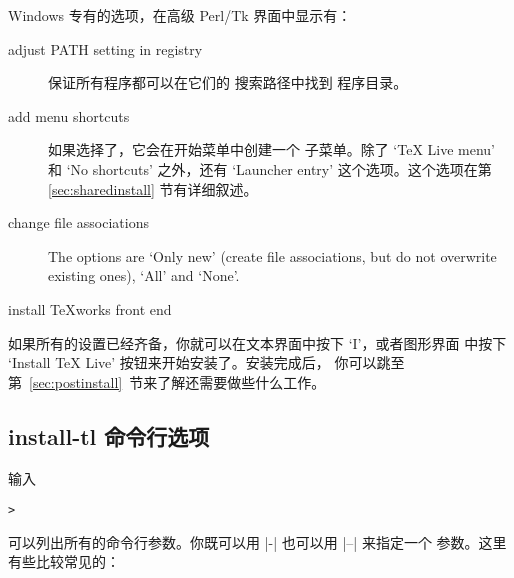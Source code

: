 \documentclass{article}
\begin{document}
Windows 专有的选项，在高级 Perl/Tk 界面中显示有：
\begin{description}
  \item[adjust PATH setting in registry] 保证所有程序都可以在它们的
    搜索路径中找到 \TL{} 程序目录。

  \item[add menu shortcuts] 如果选择了，它会在开始菜单中创建一个 \TL{}
    子菜单。除了 `TeX Live menu' 和 `No shortcuts' 之外，还有 `Launcher entry'
    这个选项。这个选项在第 \ref{sec:sharedinstall} 节有详细叙述。

  \item[change file associations] The options are `Only new' (create
    file associations, but do not overwrite existing ones), `All' and
    `None'.

  \item[install \TeX{}works front end]
\end{description}

如果所有的设置已经齐备，你就可以在文本界面中按下 `I'，或者图形界面
中按下 `Install TeX Live' 按钮来开始安装了。安装完成后，
你可以跳至第~\ref{sec:postinstall}~节来了解还需要做些什么工作。

\subsection{install-tl 命令行选项}
\label{sec:cmdline}

输入
\begin{alltt}
  > 
\end{alltt}
可以列出所有的命令行参数。你既可以用 |-| 也可以用 |--| 来指定一个
参数。这里有些比较常见的：
\end{document}
